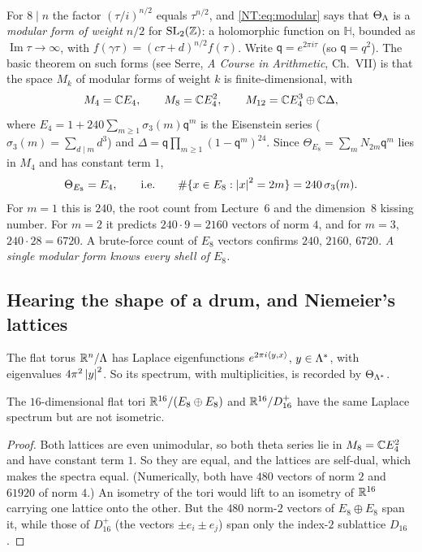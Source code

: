 For $8\mid n$ the factor $(\tau/i)^{n/2}$ equals $\tau^{n/2}$, and \eqref{NT:eq:modular} says that
$\Theta_\Lambda$ is a \emph{modular form of weight $n/2$} for $\mathrm{SL}_2(\mathbb{Z})$: a holomorphic function on
$\mathbb H$, bounded as $\operatorname{Im}\tau\to\infty$, with $f(\gamma\tau)=(c\tau+d)^{n/2}f(\tau)$.
Write $\mathsf q=e^{2\pi i\tau}$ (so $\mathsf q=q^2$). The basic theorem on such forms (see Serre,
\emph{A Course in Arithmetic}, Ch.~VII) is that the space $M_k$ of modular forms of weight $k$ is
finite-dimensional, with
\[
  M_4=\mathbb{C} E_4,\qquad M_8=\mathbb{C} E_4^2,\qquad M_{12}=\mathbb{C} E_4^3\oplus\mathbb{C}\Delta,
\]
where $E_4=1+240\sum_{m\ge1}\sigma_3(m)\mathsf q^m$ is the Eisenstein series
($\sigma_3(m)=\sum_{d\mid m}d^3$) and $\Delta=\mathsf q\prod_{m\ge1}(1-\mathsf q^m)^{24}$. Since
$\Theta_{E_8}=\sum_mN_{2m}\mathsf q^m$ lies in $M_4$ and has constant term $1$,
\begin{equation}\label{NT:eq:E8theta}
  \Theta_{E_8}=E_4,\qquad\text{i.e.}\qquad
  \#\{x\in E_8:\left\lvert x \right\rvert^2=2m\}=240\,\sigma_3(m).
\end{equation}
For $m=1$ this is $240$, the root count from Lecture~6 and the dimension~$8$ kissing number. For $m=2$
it predicts $240\cdot9=2160$ vectors of norm $4$, and for $m=3$, $240\cdot28=6720$. A brute-force count
of $E_8$ vectors confirms $240,\,2160,\,6720$. \emph{A single modular form knows every shell of $E_8$.}

\subsection*{Hearing the shape of a drum, and Niemeier's lattices}

The flat torus $\mathbb{R}^n/\Lambda$ has Laplace eigenfunctions $e^{2\pi i\langle y, x\rangle}$, $y\in\Lambda^*$, with eigenvalues
$4\pi^2\left\lvert y \right\rvert^2$. So its spectrum, with multiplicities, is recorded by $\Theta_{\Lambda^*}$.

\begin{theorem}[Milnor 1964]\label{NT:thm:milnor}
The $16$-dimensional flat tori $\mathbb{R}^{16}/(E_8\oplus E_8)$ and $\mathbb{R}^{16}/D_{16}^+$ have the same Laplace
spectrum but are not isometric.
\end{theorem}

\begin{proof}
Both lattices are even unimodular, so both theta series lie in $M_8=\mathbb{C} E_4^2$ and have constant term $1$.
So they are equal, and the lattices are self-dual, which makes the spectra equal. (Numerically, both have
$480$ vectors of norm $2$ and $61920$ of norm $4$.) An isometry of the tori would lift to an isometry of
$\mathbb{R}^{16}$ carrying one lattice onto the other. But the $480$ norm-$2$ vectors of $E_8\oplus E_8$ span it,
while those of $D_{16}^+$ (the vectors $\pm e_i\pm e_j$) span only the index-$2$ sublattice $D_{16}$.
\end{proof}

